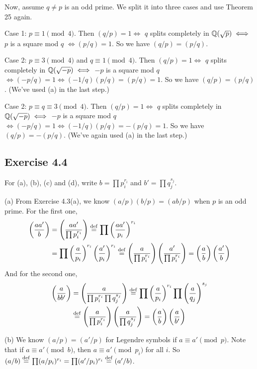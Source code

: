 \documentclass[../Marcus.tex]{subfiles}
\begin{document}
Now, assume $q\neq p$ is an odd prime. We split it into three cases and use Theorem 25 again.

Case 1: $p\equiv 1\pmod{4}$. Then $(q/p)=1 \iff$ $q$ splits completely in $\mathbb{Q}(\sqrt{p}) \iff$ $p$ is a square mod $q$ $\iff (p/q)=1$. So we have $(q/p)=(p/q)$.

Case 2: $p\equiv 3\pmod{4}$ and $q\equiv 1\pmod{4}$. Then $(q/p)=1 \iff$ $q$ splits completely in $\mathbb{Q}(\sqrt{-p}) \iff$ $-p$ is a square mod $q$ $\iff (-p/q)=1 \iff (-1/q)(p/q)=(p/q)=1$. So we have $(q/p)=(p/q)$. (We've used (a) in the last step.)

Case 2: $p\equiv q \equiv3\pmod{4}$. Then $(q/p)=1 \iff$ $q$ splits completely in $\mathbb{Q}(\sqrt{-p}) \iff$ $-p$ is a square mod $q$ $\iff (-p/q)=1 \iff (-1/q)(p/q)=-(p/q)=1$. So we have $(q/p)=-(p/q)$. (We've again used (a) in the last step.)

\subsection*{Exercise 4.4}

For (a), (b), (c) and (d), write $b=\prod p_i^{r_i}$ and $b'=\prod q_j^{s_j}$.

(a) From Exercise 4.3(a), we know $(a/p)(b/p)=(ab/p)$ when $p$ is an odd prime. For the first one,
\begin{align*}
    \left(\dfrac{aa'}{b}\right) &= \left(\dfrac{aa'}{\prod p_i^{r_i}}\right) \overset{\operatorname{def}}{=} \prod\left(\dfrac{aa'}{p_i}\right)^{r_i} \\
    &= \prod \left(\dfrac{a}{p_i}\right)^{r_i}\left(\dfrac{a'}{p_i}\right)^{r_i}
    \overset{\operatorname{def}}{=} \left(\dfrac{a}{\prod p_i^{r_i}}\right)\left(\dfrac{a'}{\prod p_i^{r_i}}\right) = \left(\dfrac{a}{b}\right)\left(\dfrac{a'}{b}\right)
\end{align*}
And for the second one,
\begin{align*}
    \left(\dfrac{a}{bb'}\right) &= \left(\dfrac{a}{\prod p_i^{r_i}\prod q_j^{s_j}}\right) \overset{\operatorname{def}}{=} \prod\left(\dfrac{a}{p_i}\right)^{r_i}\prod\left(\dfrac{a}{q_j}\right)^{s_j} \\
    &\overset{\operatorname{def}}{=} \left(\dfrac{a}{\prod p_i^{r_i}}\right)\left(\dfrac{a}{\prod q_j^{s_j}}\right) = \left(\dfrac{a}{b}\right)\left(\dfrac{a}{b'}\right)
\end{align*}

(b) We know $(a/p)=(a'/p)$ for Legendre symbols if $a\equiv a'\pmod{p}$. Note that if $a\equiv a'\pmod{b}$, then $a\equiv a'\pmod{p_i}$ for all $i$. So $(a/b)\overset{\operatorname{def}}{=}\prod (a/p_i)^{r_i}=\prod (a'/p_i)^{r_i}\overset{\operatorname{def}}{=}(a'/b)$.
\end{document}
